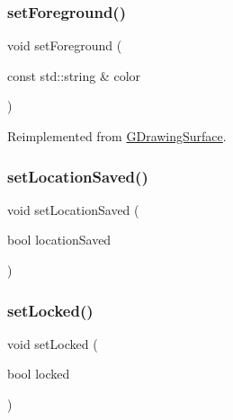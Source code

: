\subsubsection{\texorpdfstring{set\+Foreground()}{setForeground()}\hspace{0.1cm}{\footnotesize\ttfamily [2/2]}}
{\footnotesize\ttfamily void set\+Foreground (\begin{DoxyParamCaption}\item[{const std\+::string \&}]{color }\end{DoxyParamCaption})\hspace{0.3cm}{\ttfamily [virtual]}}



Reimplemented from \mbox{\hyperlink{classGDrawingSurface_af59209aeadea6dfc6d97a2d8531f50e1}{G\+Drawing\+Surface}}.

\mbox{\label{classGConsoleWindow_a09e1b8e5702b3e4fb3d508fb8d0d7eb8}} 
\subsubsection{\texorpdfstring{set\+Location\+Saved()}{setLocationSaved()}}
{\footnotesize\ttfamily void set\+Location\+Saved (\begin{DoxyParamCaption}\item[{bool}]{location\+Saved }\end{DoxyParamCaption})\hspace{0.3cm}{\ttfamily [virtual]}}

\mbox{\label{classGConsoleWindow_a1d054ba8ac31a4bee0e981be35215693}} 
\subsubsection{\texorpdfstring{set\+Locked()}{setLocked()}}
{\footnotesize\ttfamily void set\+Locked (\begin{DoxyParamCaption}\item[{bool}]{locked }\end{DoxyParamCaption})\hspace{0.3cm}{\ttfamily [virtual]}}

